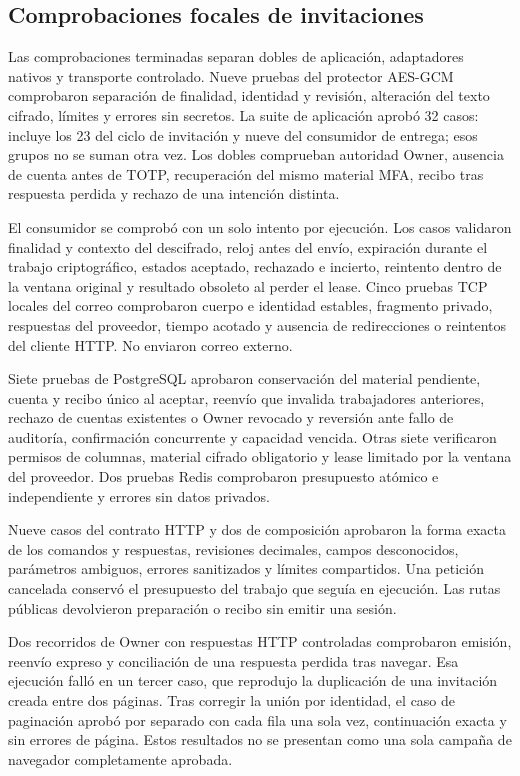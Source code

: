 \subsection{Comprobaciones focales de invitaciones}\label{sec:pruebas-invitaciones}

Las comprobaciones terminadas separan dobles de aplicaci\'on, adaptadores nativos
y transporte controlado. Nueve pruebas del protector AES-GCM comprobaron
separaci\'on de finalidad, identidad y revisi\'on, alteraci\'on del texto cifrado,
l\'imites y errores sin secretos. La suite de aplicaci\'on aprob\'o 32 casos:
incluye los 23 del ciclo de invitaci\'on y nueve del consumidor de entrega; esos
grupos no se suman otra vez. Los dobles comprueban autoridad Owner, ausencia de
cuenta antes de TOTP, recuperaci\'on del mismo material MFA, recibo tras respuesta
perdida y rechazo de una intenci\'on distinta.

El consumidor se comprob\'o con un solo intento por ejecuci\'on. Los casos
validaron finalidad y contexto del descifrado, reloj antes del env\'io, expiraci\'on
durante el trabajo criptogr\'afico, estados aceptado, rechazado e incierto,
reintento dentro de la ventana original y resultado obsoleto al perder el lease.
Cinco pruebas TCP locales del correo comprobaron cuerpo e identidad estables,
fragmento privado, respuestas del proveedor, tiempo acotado y ausencia de
redirecciones o reintentos del cliente HTTP. No enviaron correo externo.

Siete pruebas de PostgreSQL aprobaron conservaci\'on del material pendiente,
cuenta y recibo \'unico al aceptar, reenv\'io que invalida trabajadores anteriores,
rechazo de cuentas existentes o Owner revocado y reversi\'on ante fallo de
auditor\'ia, confirmaci\'on concurrente y capacidad vencida. Otras siete
verificaron permisos de columnas, material cifrado
obligatorio y lease limitado por la ventana del proveedor. Dos pruebas Redis
comprobaron presupuesto at\'omico e independiente y errores sin datos privados.

Nueve casos del contrato HTTP y dos de composici\'on aprobaron la forma exacta
de los comandos y respuestas, revisiones decimales, campos desconocidos,
par\'ametros ambiguos, errores sanitizados y l\'imites compartidos. Una petici\'on
cancelada conserv\'o el presupuesto del trabajo que segu\'ia en ejecuci\'on. Las
rutas p\'ublicas devolvieron preparaci\'on o recibo sin emitir una sesi\'on.

Dos recorridos de Owner con respuestas HTTP controladas comprobaron emisi\'on,
reenv\'io expreso y conciliaci\'on de una respuesta perdida tras navegar. Esa
ejecuci\'on fall\'o en un tercer caso, que reprodujo la duplicaci\'on de una
invitaci\'on creada entre dos p\'aginas. Tras corregir la uni\'on por identidad,
el caso de paginaci\'on aprob\'o por separado con cada fila una sola vez,
continuaci\'on exacta y sin errores de p\'agina. Estos resultados no se presentan
como una sola campa\~na de navegador completamente aprobada.

